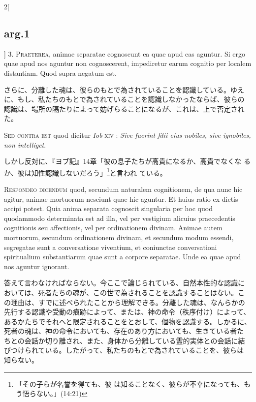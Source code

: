 \documentclass[paper=a4paper,fontsize=10pt,jafontsize=9pt,titlepage]{jlreq}
\begin{document}
\begin{paracol}{2}[\subsection{arg.1}]
3. {\scshape Praeterea}, animae separatae cognoscunt ea quae apud eas
aguntur. Si ergo quae apud nos aguntur non cognoscerent, impediretur
earum cognitio per localem distantiam. Quod supra negatum est.

\switchcolumn

さらに、分離した魂は、彼らのもとで為されていることを認識している。ゆえ
に、もし、私たちのもとで為されていることを認識しなかったならば、彼らの
認識は、場所の隔たりによって妨げらることになるが、これは、上で否定され
た。

\switchcolumn*[\subsection{s.c.}]

{\scshape Sed contra est} quod dicitur {\itshape Iob} {\scshape xiv} : {\itshape Sive
fuerint filii eius nobiles, sive ignobiles, non intelliget}.

\switchcolumn

しかし反対に、『ヨブ記』14章「彼の息子たちが高貴になるか、高貴でなくな
るか、彼は知性認識しないだろう」\footnote{「その子らが名誉を得ても、彼
は知ることなく、彼らが不幸になっても、もう悟らない。」(14:21)}と言われ
ている。


{\scshape Respondeo dicendum} quod, secundum naturalem cognitionem, de qua
nunc hic agitur, animae mortuorum nesciunt quae hic aguntur. Et huius
ratio ex dictis accipi potest. Quia anima separata cognoscit
singularia per hoc quod quodammodo determinata est ad illa, vel per
vestigium alicuius praecedentis cognitionis seu affectionis, vel per
ordinationem divinam. Animae autem mortuorum, secundum ordinationem
divinam, et secundum modum essendi, segregatae sunt a conversatione
viventium, et coniunctae conversationi spiritualium substantiarum quae
sunt a corpore separatae. Unde ea quae apud nos aguntur ignorant.

\switchcolumn

答えて言わなければならない。今ここで論じられている、自然本性的な認識に
おいては、死者たちの魂が、この世で為されることを認識することはない。こ
の理由は、すでに述べられたことから理解できる。分離した魂は、なんらかの
先行する認識や受動の痕跡によって、または、神の命令（秩序付け）によって、
あるかたちでそれへと限定されることをとおして、個物を認識する。しかるに、
死者の魂は、神の命令においても、存在のあり方においても、生きている者た
ちとの会話か切り離され、また、身体から分離している霊的実体との会話に結
びつけられている。したがって、私たちのもとで為されていることを、彼らは
知らない。


\end{paracol}
\end{document}
